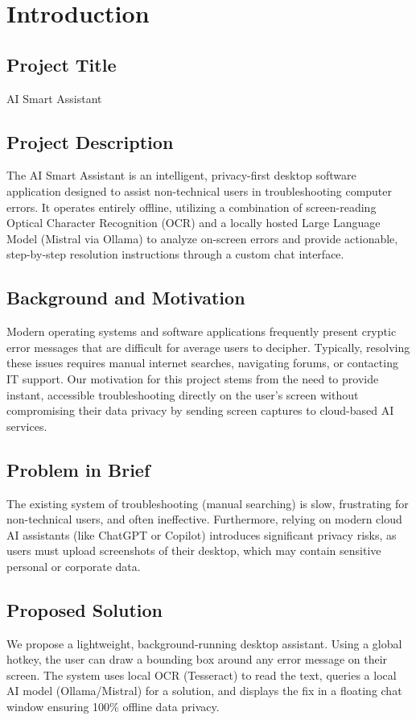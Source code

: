 \documentclass[12pt,a4paper]{report}
\begin{document}
\newpage
\tableofcontents
\newpage

\chapter{Introduction}

\section{Project Title}
AI Smart Assistant

\section{Project Description}
The AI Smart Assistant is an intelligent, privacy-first desktop software application designed to assist non-technical users in troubleshooting computer errors. It operates entirely offline, utilizing a combination of screen-reading Optical Character Recognition (OCR) and a locally hosted Large Language Model (Mistral via Ollama) to analyze on-screen errors and provide actionable, step-by-step resolution instructions through a custom chat interface.

\section{Background and Motivation}
Modern operating systems and software applications frequently present cryptic error messages that are difficult for average users to decipher. Typically, resolving these issues requires manual internet searches, navigating forums, or contacting IT support. Our motivation for this project stems from the need to provide instant, accessible troubleshooting directly on the user's screen without compromising their data privacy by sending screen captures to cloud-based AI services.

\section{Problem in Brief}
The existing system of troubleshooting (manual searching) is slow, frustrating for non-technical users, and often ineffective. Furthermore, relying on modern cloud AI assistants (like ChatGPT or Copilot) introduces significant privacy risks, as users must upload screenshots of their desktop, which may contain sensitive personal or corporate data.

\section{Proposed Solution}
We propose a lightweight, background-running desktop assistant. Using a global hotkey, the user can draw a bounding box around any error message on their screen. The system uses local OCR (Tesseract) to read the text, queries a local AI model (Ollama/Mistral) for a solution, and displays the fix in a floating chat window ensuring 100\% offline data privacy.
\end{document}
